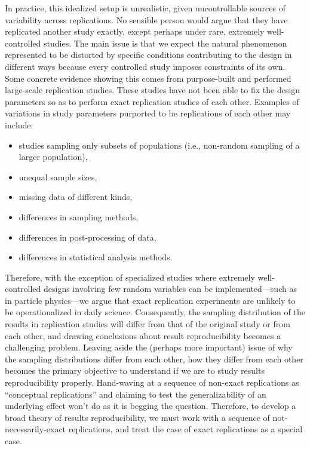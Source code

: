 \documentclass[meta,authordate,issue]{jote-new-article}
\newcounter{result}
\begin{document}
In practice, this idealized setup is unrealistic, given uncontrollable sources of variability across replications. No sensible person would argue that they have replicated another study exactly, except perhaps under rare, extremely well-controlled studies. The main issue is that we expect the natural phenomenon represented to be distorted by specific conditions contributing to the design in different ways because every controlled study imposes constraints of its own. Some concrete evidence showing this comes from purpose-built and performed large-scale replication studies. These studies have not been able to fix the design parameters so as to perform exact replication studies of each other. Examples of variations in study parameters purported to be replications of each other may include:
\newpage
\begin{itemize}
  \item studies sampling only subsets of populations (i.e., non-random sampling of a larger population),
  \item unequal sample sizes,
  \item missing data of different kinds,
  \item differences in sampling methods,
  \item differences in post-processing of data,
  \item differences in statistical analysis methods.
\end{itemize}
Therefore, with the exception of specialized studies where extremely well-controlled designs involving few random variables can be implemented---such as in particle physics---we argue that exact replication experiments are unlikely to be operationalized in daily science. Consequently, the sampling distribution of the results in replication studies will differ from that of the original study or from each other, and drawing conclusions about result reproducibility becomes a challenging problem. Leaving aside the (perhaps more important) issue of why the sampling distributions differ from each other, how they differ from each other becomes the primary objective to understand if we are to study results reproducibility properly. Hand-waving at a sequence of non-exact replications as ``conceptual replications'' and claiming to test the generalizability of an underlying effect won't do as it is begging the question. Therefore, to develop a broad theory of results reproducibility, we must work with a sequence of not-necessarily-exact replications, and treat the case of exact replications as a special case.
\end{document}
